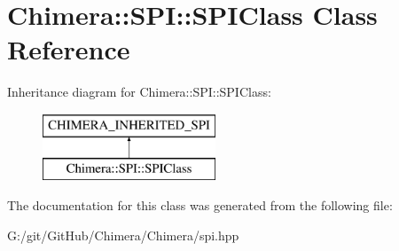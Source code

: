 \hypertarget{class_chimera_1_1_s_p_i_1_1_s_p_i_class}{}\section{Chimera\+:\+:S\+PI\+:\+:S\+P\+I\+Class Class Reference}
\label{class_chimera_1_1_s_p_i_1_1_s_p_i_class}
Inheritance diagram for Chimera\+:\+:S\+PI\+:\+:S\+P\+I\+Class\+:\begin{figure}[H]
\begin{center}
\leavevmode
\includegraphics[height=2.000000cm]{class_chimera_1_1_s_p_i_1_1_s_p_i_class}
\end{center}
\end{figure}


The documentation for this class was generated from the following file\+:\begin{DoxyCompactItemize}
\item 
G\+:/git/\+Git\+Hub/\+Chimera/\+Chimera/spi.\+hpp\end{DoxyCompactItemize}
